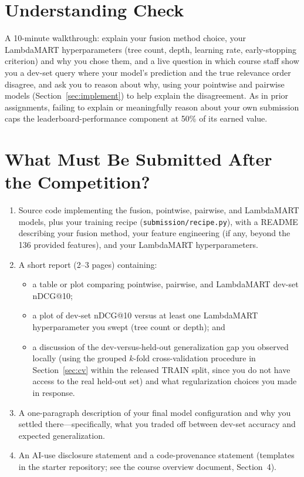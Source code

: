\documentclass[10pt]{article}
\begin{document}
\section{Understanding Check}
\label{sec:understanding}

A 10-minute walkthrough: explain your fusion method choice, your LambdaMART hyperparameters (tree count, depth, learning rate, early-stopping criterion) and why you chose them, and a live question in which course staff show you a dev-set query where your model's prediction and the true relevance order disagree, and ask you to reason about why, using your pointwise and pairwise models (Section~\ref{sec:implement}) to help explain the disagreement. As in prior assignments, failing to explain or meaningfully reason about your own submission caps the leaderboard-performance component at 50\% of its earned value.

\section{What Must Be Submitted After the Competition?}
\label{sec:deliverables}

\begin{enumerate}
  \item Source code implementing the fusion, pointwise, pairwise, and LambdaMART models, plus your training recipe (\texttt{submission/recipe.py}), with a README describing your fusion method, your feature engineering (if any, beyond the 136 provided features), and your LambdaMART hyperparameters.

  \item A short report (2--3 pages) containing:
  \begin{itemize}
    \item a table or plot comparing pointwise, pairwise, and LambdaMART dev-set nDCG@10;
    \item a plot of dev-set nDCG@10 versus at least one LambdaMART hyperparameter you swept (tree count or depth); and
    \item a discussion of the dev-versus-held-out generalization gap you observed locally (using the grouped \(k\)-fold cross-validation procedure in Section~\ref{sec:cv} within the released TRAIN split, since you do not have access to the real held-out set) and what regularization choices you made in response.
  \end{itemize}

  \item A one-paragraph description of your final model configuration and why you settled there---specifically, what you traded off between dev-set accuracy and expected generalization.

  \item An AI-use disclosure statement and a code-provenance statement (templates in the starter repository; see the course overview document, Section~4).
\end{enumerate}
\end{document}
